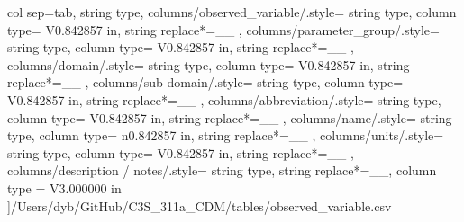 \begin{landscape}
    col sep=tab,
    string type,
    columns/observed_variable/.style={
            string type, 
            column type= V{0.842857 in}, 
            string replace*={_}{\_}
        },
    columns/parameter_group/.style={
            string type, 
            column type= V{0.842857 in}, 
            string replace*={_}{\_}
        },
    columns/domain/.style={
            string type, 
            column type= V{0.842857 in}, 
            string replace*={_}{\_}
        },
    columns/sub-domain/.style={
            string type, 
            column type= V{0.842857 in}, 
            string replace*={_}{\_}
        },
    columns/abbreviation/.style={
            string type, 
            column type= V{0.842857 in}, 
            string replace*={_}{\_}
        },
    columns/name/.style={
            string type, 
            column type= n{0.842857 in}, 
            string replace*={_}{\_}
        },
    columns/units/.style={
            string type, 
            column type= V{0.842857 in}, 
            string replace*={_}{\_}
        },
    columns/description / notes/.style={
            string type, 
            string replace*={_}{\_},
            column type = V{3.000000 in}
        }
    ]{/Users/dyb/GitHub/C3S_311a_CDM/tables/observed_variable.csv}
\end{landscape}
